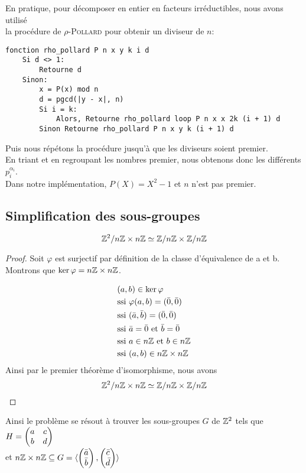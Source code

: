 \documentclass[12pt]{article}
\newcommand{\ZnZ}{\Z/n\Z}
\newcommand{\ZZ}{\ZnZ \x \ZnZ}
\begin{document}
En pratique, pour décomposer en entier en facteurs irréductibles, nous avons utilisé\\
la procédure de \textsc{$\rho$-Pollard} pour obtenir un diviseur de $n$:
\begin{lstlisting}
fonction rho_pollard P n x y k i d
    Si d <> 1:
        Retourne d
    Sinon:
        x = P(x) mod n
        d = pgcd(|y - x|, n)
        Si i = k:
            Alors, Retourne rho_pollard loop P n x x 2k (i + 1) d
        Sinon Retourne rho_pollard P n x y k (i + 1) d
\end{lstlisting}
Puis nous répétons la procédure jusqu'à que les diviseurs soient premier.\\
En triant et en regroupant les nombres premier, nous obtenons donc les différents $p^{\alpha_i}_i$.\\
Dans notre implémentation, $P(X) = X^2 - 1$ et $n$ n'est pas premier.
\newpage
\subsection{Simplification des sous-groupes}\label{simp_ss_gr}

\begin{proposition}
	$$\Z^2/n\Z \x n\Z \isom \ZZ $$
\end{proposition}
\begin{proof}
	Soit \app{\varphi}{\Z^2}{\ZZ}{(a,b)}{(\bar a, \bar b)}
	$\varphi$ est surjectif par définition de la classe d'équivalence de a et b.
	Montrons que $\ker \varphi = n\mathbb Z \times n\mathbb Z$.

	\begin{equation*}
		\begin{split}
			&(a,b) \in \ker \varphi \\
			&\text{ssi } \varphi(a,b) = (\bar 0, \bar 0)\\
			&\text{ssi } (\bar a, \bar b) = (\bar 0, \bar 0)\\
			&\text{ssi } \bar a = \bar 0 \text{ et } \bar b = \bar 0\\
			&\text{ssi } a \in n\mathbb Z \text{ et } b \in n\mathbb Z\\
			&\text{ssi } (a,b) \in  n\mathbb Z \times n\mathbb Z
		\end{split}
	\end{equation*}
	Ainsi par le premier théorème d'isomorphisme, nous avons
	$$\Z^2/n\Z \x n\Z \isom \ZZ $$
\end{proof}
Ainsi le problème se résout à trouver les sous-groupes $G$ de $\mathbb Z^2$ tels que
$H = \begin{pmatrix} a & c\\ b & d \end{pmatrix}$\\
et
$n\mathbb Z \times n\mathbb Z \subseteq G = \langle \begin{pmatrix} \bar a\\ \bar b \end{pmatrix}, \begin{pmatrix} \bar c\\ \bar d \end{pmatrix} \rangle$
\end{document}
